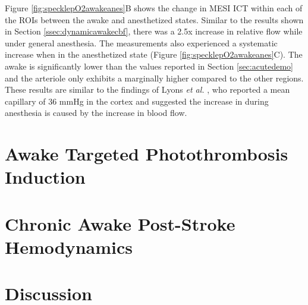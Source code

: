 Figure \ref{fig:specklepO2awakeanes}B shows the change in MESI ICT within each of the ROIs between the awake and anesthetized states. Similar to the results shown in Section \ref{ssec:dynamicawakecbf}, there was a 2.5x increase in relative flow while under general anesthesia. The  measurements also experienced a systematic increase when in the anesthetized state (Figure \ref{fig:specklepO2awakeanes}C). The awake  is significantly lower than the values reported in Section \ref{sec:acutedemo} and the arteriole only exhibits a marginally higher  compared to the other regions. These results are similar to the findings of Lyons \textit{et al.} \cite{Lyons:2016bd}, who reported a mean capillary  of 36 mmHg in the cortex and suggested the increase in  during anesthesia is caused by the increase in blood flow.



\section{Awake Targeted Photothrombosis Induction}

\blindtext



\section{Chronic Awake Post-Stroke Hemodynamics}

\blindtext



\section{Discussion}

\blindtext



